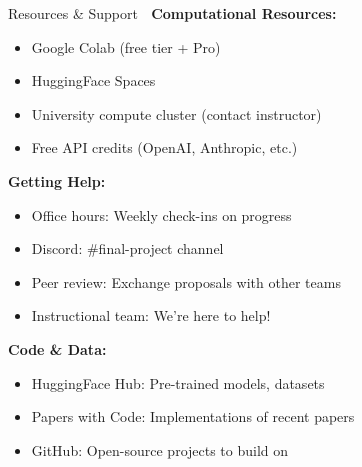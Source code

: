 \documentclass[aspectratio=169]{beamer}
\begin{document}
\begin{frame}[shrink=10]{Resources \& Support 💪}
\textbf{Computational Resources:}
\begin{itemize}\setlength{\itemsep}{0pt}
    \item Google Colab (free tier + Pro)
    \item HuggingFace Spaces
    \item University compute cluster (contact instructor)
    \item Free API credits (OpenAI, Anthropic, etc.)
\end{itemize}

\vspace{0.5em}

\textbf{Getting Help:}
\begin{itemize}\setlength{\itemsep}{0pt}
    \item Office hours: Weekly check-ins on progress
    \item Discord: \#final-project channel
    \item Peer review: Exchange proposals with other teams
    \item Instructional team: We're here to help!
\end{itemize}

\vspace{0.5em}

\textbf{Code \& Data:}
\begin{itemize}\setlength{\itemsep}{0pt}
    \item HuggingFace Hub: Pre-trained models, datasets
    \item Papers with Code: Implementations of recent papers
    \item GitHub: Open-source projects to build on
\end{itemize}
\end{frame}
\end{document}
